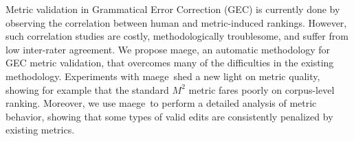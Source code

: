 Metric validation in Grammatical Error Correction (GEC) is currently done by observing the correlation between human and metric-induced rankings. However, such correlation studies are costly, methodologically troublesome, and suffer from low inter-rater agreement. We propose maege, an automatic methodology for GEC metric validation, that overcomes many of the difficulties in the existing methodology. Experiments with maege\ shed a new light on metric quality, showing for example that the standard $M^2$ metric fares poorly on corpus-level ranking. Moreover, we use maege\ to perform a detailed analysis of metric behavior, showing that some types of valid edits are consistently penalized by existing metrics.
